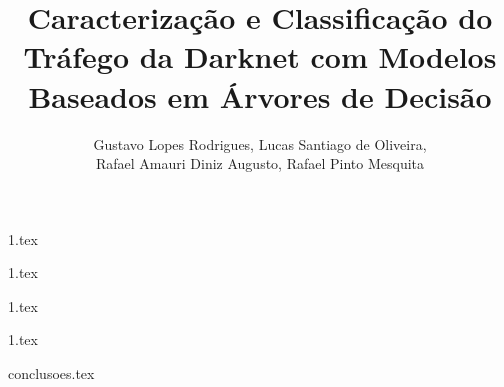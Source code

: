 \documentclass[12pt]{article}
\title{Caracterização e Classificação do Tráfego da Darknet com
Modelos Baseados em Árvores de Decisão}
\author{Gustavo Lopes Rodrigues\inst{1}, Lucas Santiago de Oliveira\inst{2}, \\
 Rafael Amauri Diniz Augusto\inst{3}, Rafael Pinto Mesquita\inst{4}}
\begin{document}
 

  \maketitle


  {1.tex}


  {1.tex}


  {1.tex}


  {1.tex}


  {conclusoes.tex}


  
\end{document}
